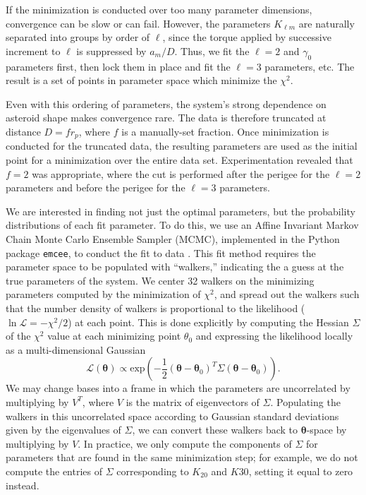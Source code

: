 \documentclass{aastex631}
\newcommand{\parens}[1]{\left( #1 \right)}
\begin{document}
If the minimization is conducted over too many parameter dimensions, convergence can be slow or can fail. However, the parameters $K_{\ell m}$ are naturally separated into groups by order of $\ell$, since the torque applied by successive increment to $\ell$ is suppressed by $a_m/D$. Thus, we fit the $\ell=2$ and $\gamma_0$ parameters first, then lock them in place and fit the $\ell=3$ parameters, etc. The result is a set of points in parameter space which minimize the $\chi^2$.

Even with this ordering of parameters, the system's strong dependence on asteroid shape makes convergence rare. The data is therefore truncated at distance $D = f r_p$, where $f$ is a manually-set fraction. Once minimization is conducted for the truncated data, the resulting parameters are used as the initial point for a minimization over the entire data set. Experimentation revealed that $f=2$ was appropriate, where the cut is performed after the perigee for the $\ell = 2$ parameters and before the perigee for the $\ell = 3$ parameters.

We are interested in finding not just the optimal parameters, but the probability distributions of each fit parameter. To do this, we use an Affine Invariant Markov Chain Monte Carlo Ensemble Sampler (MCMC), implemented in the Python package \texttt{emcee}, to conduct the fit to data \cite{ForemanMackey2013emceeTM}. This fit method requires the parameter space to be populated with ``walkers,'' indicating the a guess at the true parameters of the system. We center 32 walkers on the minimizing parameters computed by the minimization of $\chi^2$, and spread out the walkers such that the number density of walkers is proportional to the likelihood ($\ln \mathcal{L} = -\chi^2/2$) at each point. This is done explicitly by computing the Hessian $\Sigma$ of the $\chi^2$ value at each minimizing point $\theta_0$ and expressing the likelihood locally as a multi-dimensional Gaussian
\begin{equation}
\mathcal{L}(\mathbf \theta) \propto \text{exp}\parens{-\frac{1}{2}(\mathbf \theta-\mathbf \theta_0)^T \Sigma (\mathbf \theta-\mathbf \theta_0)}.
\end{equation}
We may change bases into a frame in which the parameters are uncorrelated by multiplying by $V^T$, where $V$ is the matrix of eigenvectors of $\Sigma$. Populating the walkers in this uncorrelated space according to Gaussian standard deviations given by the eigenvalues of $\Sigma$, we can convert these walkers back to $\mathbf \theta$-space by multiplying by $V$. In practice, we only compute the components of $\Sigma$ for parameters that are found in the same minimization step; for example, we do not compute the entries of $\Sigma$ corresponding to $K_{20}$ and $K{30}$, setting it equal to zero instead.
\end{document}
